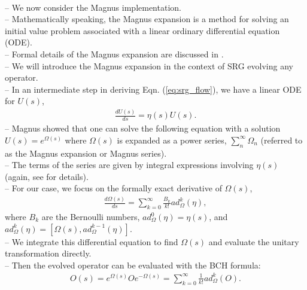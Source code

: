 \documentclass[preprintnumbers,floatfix,aps,prc,preprint,nofootinbib]{revtex4-1}
\begin{document}
\\
-- We now consider the Magnus implementation.
\\
-- Mathematically speaking, the Magnus expansion is a method for solving an initial value problem associated with a linear ordinary differential equation (ODE).
\\
-- Formal details of the Magnus expansion are discussed in \cite{Blanes:2009ab}.
\\
-- We will introduce the Magnus expansion in the context of SRG evolving any operator.
\\
-- In an intermediate step in deriving Eqn. (\ref{eq:srg_flow}), we have a linear ODE for $U(s)$,
%
\begin{eqnarray}
	\label{eq:unitary_trans}
	\frac{dU(s)}{ds} = \eta(s) U(s).
\end{eqnarray}
%
-- Magnus showed that one can solve the following equation with a solution $U(s)=e^{\Omega(s)}$ where $\Omega(s)$ is expanded as a power series, $\sum_{n}^{\infty} \Omega_n$ (referred to as the Magnus expansion or Magnus series).
\\
-- The terms of the series are given by integral expressions involving $\eta(s)$ (again, see \cite{Blanes:2009ab, Magnus:1954zz} for details).
\\
-- For our case, we focus on the formally exact derivative of $\Omega(s)$,
%
\begin{eqnarray}
	\label{eq:magnus_omega}
	\frac{d\Omega(s)}{ds} = \sum_{k=0}^{\infty} \frac{B_k}{k!} ad_{\Omega}^{k}(\eta),
\end{eqnarray}
%
where $B_k$ are the Bernoulli numbers, $ad_{\Omega}^{0}(\eta)=\eta(s)$, and $ad_{\Omega}^{k}(\eta)=[\Omega(s),ad_{\Omega}^{k-1}(\eta)]$.
\\
-- We integrate this differential equation to find $\Omega(s)$ and evaluate the unitary transformation directly.
\\
-- Then the evolved operator can be evaluated with the BCH formula:
%
\begin{eqnarray}
	\label{eq:bch}
	O(s) = e^{\Omega(s)} O e^{-\Omega(s)} = \sum_{k=0}^{\infty} \frac{1}{k!} ad_{\Omega}^{k}(O).
\end{eqnarray}
\end{document}
